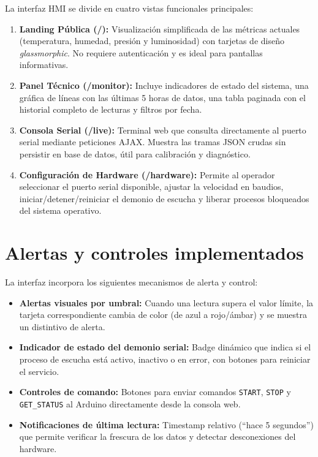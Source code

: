 La interfaz HMI se divide en cuatro vistas funcionales principales:

\begin{enumerate}[leftmargin=*]
    \item \textbf{Landing Pública (/):} Visualización simplificada de las métricas actuales (temperatura, humedad, presión y luminosidad) con tarjetas de diseño \textit{glassmorphic}. No requiere autenticación y es ideal para pantallas informativas.
    
    \item \textbf{Panel Técnico (/monitor):} Incluye indicadores de estado del sistema, una gráfica de líneas con las últimas 5 horas de datos, una tabla paginada con el historial completo de lecturas y filtros por fecha.
    
    \item \textbf{Consola Serial (/live):} Terminal web que consulta directamente al puerto serial mediante peticiones AJAX. Muestra las tramas JSON crudas sin persistir en base de datos, útil para calibración y diagnóstico.
    
    \item \textbf{Configuración de Hardware (/hardware):} Permite al operador seleccionar el puerto serial disponible, ajustar la velocidad en baudios, iniciar/detener/reiniciar el demonio de escucha y liberar procesos bloqueados del sistema operativo.
\end{enumerate}

\section{Alertas y controles implementados}

La interfaz incorpora los siguientes mecanismos de alerta y control:

\begin{itemize}[leftmargin=*]
    \item \textbf{Alertas visuales por umbral:} Cuando una lectura supera el valor límite, la tarjeta correspondiente cambia de color (de azul a rojo/ámbar) y se muestra un distintivo de alerta.
    \item \textbf{Indicador de estado del demonio serial:} Badge dinámico que indica si el proceso de escucha está activo, inactivo o en error, con botones para reiniciar el servicio.
    \item \textbf{Controles de comando:} Botones para enviar comandos \texttt{START}, \texttt{STOP} y \texttt{GET\_STATUS} al Arduino directamente desde la consola web.
    \item \textbf{Notificaciones de última lectura:} Timestamp relativo (``hace 5 segundos'') que permite verificar la frescura de los datos y detectar desconexiones del hardware.
\end{itemize}


